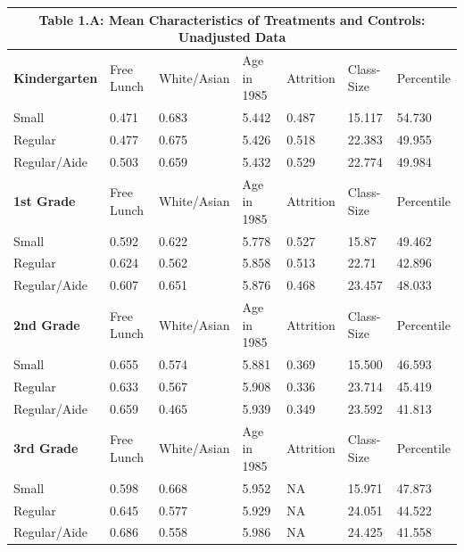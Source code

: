 \documentclass[a4paper,11pt]{article}
\begin{document}
\begin{table}[H]
\begin{center}
\begin{tabular}{l|llllll} 
	\multicolumn{7}{c}{Table 1.A: Mean Characteristics of Treatments and Controls: Unadjusted Data} \\ \hline \hline
	\textbf{Kindergarten} & Free Lunch  & White/Asian  & Age in 1985  & Attrition  & Class-Size  & Percentile  \\  \hline 
	Small & 0.471 & 0.683 & 5.442 & 0.487 & 15.117 & 54.730 \\  
	Regular & 0.477 & 0.675 & 5.426 & 0.518 & 22.383 & 49.955 \\  
	Regular/Aide & 0.503 & 0.659 & 5.432 & 0.529 & 22.774 & 49.984 \\ \hline \hline
	\textbf{1st Grade}& Free Lunch  & White/Asian  & Age in 1985  & Attrition  & Class-Size  & Percentile  \\  \hline 
	Small & 0.592 & 0.622 & 5.778 & 0.527 & 15.87 & 49.462 \\  
	Regular & 0.624 & 0.562 & 5.858 & 0.513 & 22.71 & 42.896 \\  
	Regular/Aide & 0.607 & 0.651 & 5.876 & 0.468 & 23.457 & 48.033 \\ \hline \hline   
	\textbf{2nd Grade} & Free Lunch  & White/Asian  & Age in 1985  & Attrition  & Class-Size  & Percentile  \\  \hline 
	Small & 0.655 & 0.574 & 5.881 & 0.369 & 15.500 & 46.593 \\  
	Regular & 0.633 & 0.567 & 5.908 & 0.336 & 23.714 & 45.419 \\  
	Regular/Aide & 0.659 & 0.465 & 5.939 & 0.349 & 23.592 & 41.813 \\  \hline \hline 
	\textbf{3rd Grade} & Free Lunch  & White/Asian  & Age in 1985  & Attrition  & Class-Size  & Percentile  \\  \hline 
	Small & 0.598 & 0.668 & 5.952 & NA & 15.971 & 47.873 \\  
	Regular & 0.645 & 0.577 & 5.929 & NA & 24.051 & 44.522 \\  
	Regular/Aide & 0.686 & 0.558 & 5.986 & NA & 24.425 & 41.558 \\  
	\hline \hline 
\end{tabular}
\end{center}
\end{table}
\end{document}
